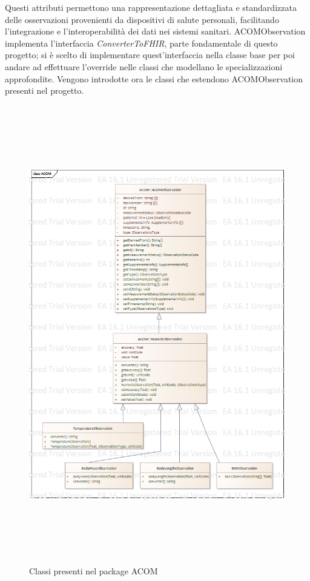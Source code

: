\documentclass[a4paper]{article}
\begin{document}
Questi attributi permettono una rappresentazione dettagliata e standardizzata delle osservazioni provenienti da dispositivi di salute personali, facilitando l'integrazione e l'interoperabilità dei dati nei sistemi sanitari.
ACOMObservation implementa l'interfaccia \textit{ConverterToFHIR}, parte fondamentale di questo progetto; si è scelto di implementare quest'interfaccia nella classe base per poi andare ad effettuare l'override nelle classi che modellano le specializzazioni approfondite.
Vengono introdotte ora le classi che estendono ACOMObservation presenti nel progetto.
\begin{figure}[H]
    \centering
    \includegraphics[width=12cm, height=20cm]{figures/ACOM.png}
    \caption{Classi presenti nel package ACOM}
    \label{fig:Acom}
\end{figure}
\end{document}
